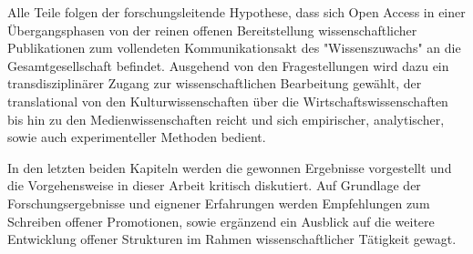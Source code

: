 Alle Teile folgen der forschungsleitende Hypothese, dass sich Open Access in einer Übergangsphasen von der reinen offenen Bereitstellung wissenschaftlicher Publikationen zum vollendeten Kommunikationsakt des "Wissenszuwachs" \cite{Luhmann1998} an die Gesamtgesellschaft befindet. Ausgehend von den Fragestellungen wird dazu ein transdisziplinärer Zugang zur wissenschaftlichen Bearbeitung gewählt, der translational von den Kulturwissenschaften über die Wirtschaftswissenschaften bis hin zu den Medienwissenschaften reicht und sich empirischer, analytischer, sowie auch experimenteller Methoden bedient.

In den letzten beiden Kapiteln werden die gewonnen Ergebnisse vorgestellt und die Vorgehensweise in dieser Arbeit kritisch diskutiert. Auf Grundlage der Forschungsergebnisse und eignener Erfahrungen werden Empfehlungen zum Schreiben offener Promotionen, sowie ergänzend ein Ausblick auf die weitere Entwicklung offener Strukturen im Rahmen wissenschaftlicher Tätigkeit gewagt.

